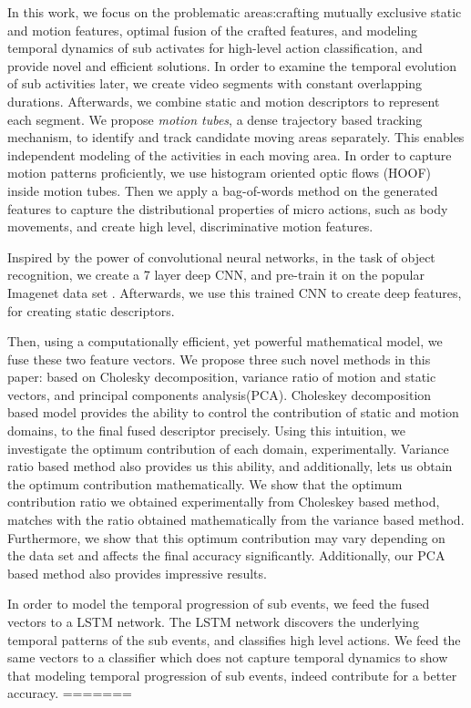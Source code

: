 In this work, we focus on the problematic areas:crafting mutually exclusive static and motion features, optimal fusion of the crafted features, and
modeling temporal dynamics of sub activates for high-level action classification, and provide
novel and efficient solutions. In order to examine the temporal evolution
of sub activities later, we create video segments with constant overlapping durations. Afterwards, we combine static and motion
descriptors to represent each segment. We propose \textit{motion tubes},
a dense trajectory \cite{wang2011action} based tracking mechanism, to identify and track candidate moving areas
separately. This enables independent modeling of the activities in each moving area.
In order to capture motion patterns proficiently, we use histogram oriented optic flows (HOOF) \cite{chaudhry2009histograms}
inside motion tubes. Then we apply a bag-of-words method on the generated
features to capture the distributional properties of micro actions, such as body movements, and create high level, discriminative motion features.

Inspired by the power of convolutional neural networks, in the task of object recognition, we create a 7 layer deep
CNN, and pre-train it on the popular Imagenet data set \cite{deng2012imagenet}.
Afterwards, we use this trained CNN to create deep features, for creating static descriptors.

Then, using a computationally efficient, yet powerful mathematical model, we fuse these
two feature vectors. We propose three such novel methods in this paper: based on
Cholesky decomposition, variance ratio of motion and static vectors, and principal components analysis(PCA). Choleskey decomposition based model provides the ability to
control the contribution of static and motion domains,
to the final fused descriptor precisely. Using this intuition, we investigate the
optimum contribution of each domain, experimentally.  Variance ratio based method also provides us this ability, and additionally, lets us
obtain the optimum contribution mathematically. We show that the optimum contribution ratio we obtained experimentally from Choleskey based method,
matches with the ratio obtained mathematically from the variance based method. Furthermore, we show that this optimum contribution may
vary depending on the data set and affects the final accuracy significantly. Additionally, our PCA based method also provides
impressive results.


In order to model the temporal progression of sub events, we feed the fused vectors to
a LSTM network. The LSTM network discovers the underlying temporal patterns of the sub events, and classifies high level actions.
We feed the same vectors to a classifier which does not capture temporal dynamics
to show that modeling temporal progression of sub events, indeed contribute for a better
accuracy.
=======

